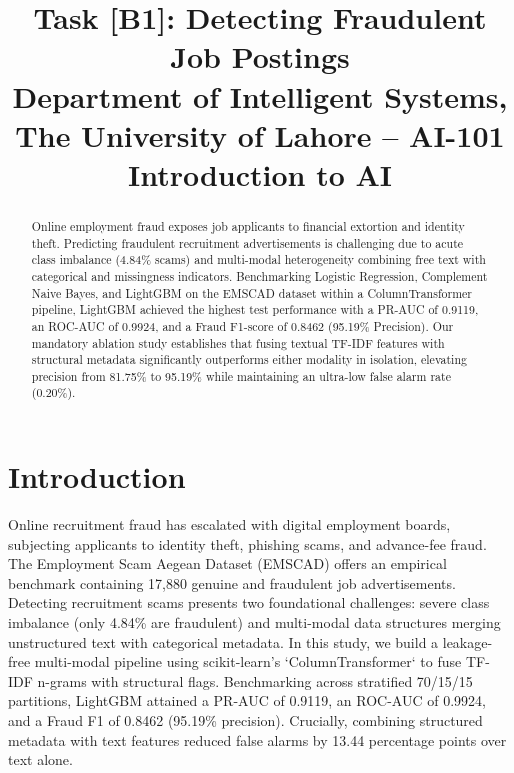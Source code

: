 \documentclass[conference,10pt]{IEEEtran}
\begin{document}
\title{Task [B1]: Detecting Fraudulent Job Postings\\
\large Department of Intelligent Systems, The University of Lahore -- AI-101 Introduction to AI}

\author{
}

\maketitle

\begin{abstract}
Online employment fraud exposes job applicants to financial extortion and identity theft. Predicting fraudulent recruitment advertisements is challenging due to acute class imbalance (4.84\% scams) and multi-modal heterogeneity combining free text with categorical and missingness indicators. Benchmarking Logistic Regression, Complement Naive Bayes, and LightGBM on the EMSCAD dataset within a ColumnTransformer pipeline, LightGBM achieved the highest test performance with a PR-AUC of 0.9119, an ROC-AUC of 0.9924, and a Fraud F1-score of 0.8462 (95.19\% Precision). Our mandatory ablation study establishes that fusing textual TF-IDF features with structural metadata significantly outperforms either modality in isolation, elevating precision from 81.75\% to 95.19\% while maintaining an ultra-low false alarm rate (0.20\%).
\end{abstract}

\section{Introduction}
Online recruitment fraud has escalated with digital employment boards, subjecting applicants to identity theft, phishing scams, and advance-fee fraud. The Employment Scam Aegean Dataset (EMSCAD) offers an empirical benchmark containing 17,880 genuine and fraudulent job advertisements. Detecting recruitment scams presents two foundational challenges: severe class imbalance (only 4.84\% are fraudulent) and multi-modal data structures merging unstructured text with categorical metadata. In this study, we build a leakage-free multi-modal pipeline using scikit-learn's `ColumnTransformer` to fuse TF-IDF n-grams with structural flags. Benchmarking across stratified 70/15/15 partitions, LightGBM attained a PR-AUC of 0.9119, an ROC-AUC of 0.9924, and a Fraud F1 of 0.8462 (95.19\% precision). Crucially, combining structured metadata with text features reduced false alarms by 13.44 percentage points over text alone.
\end{document}

